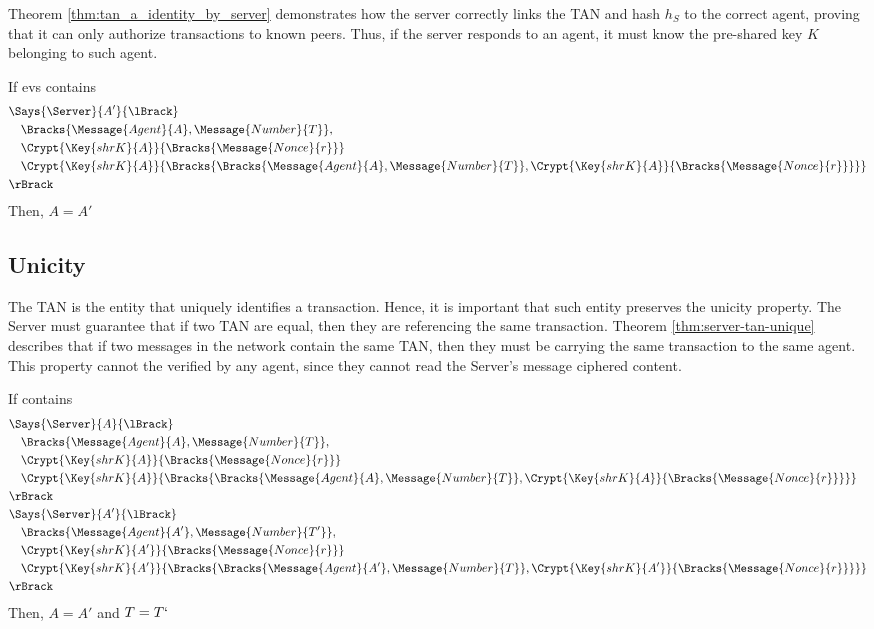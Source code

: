 Theorem \ref{thm:tan_a_identity_by_server} demonstrates how the server correctly links the TAN and hash \(h_S\) to the correct agent, proving that it can only authorize transactions to known peers. Thus, if the server responds to an agent, it must know the pre-shared key \(K\) belonging to such agent.

\begin{theorem}
  \label{thm:tan_a_identity_by_server}
  If evs contains
  \begin{align*}
    & \Says{\Server}{A'}{\lBrack} \\
      & \quad \Bracks{\Message{Agent}{A}, \Message{Number}{T}}, \\
      & \quad \Crypt{\Key{shrK}{A}}{\Bracks{\Message{Nonce}{r}}} \\
      & \quad \Crypt{\Key{shrK}{A}}{\Bracks{\Bracks{\Message{Agent}{A}, \Message{Number}{T}},\Crypt{\Key{shrK}{A}}{\Bracks{\Message{Nonce}{r}}}}} \\
    & \rBrack
  \end{align*}
  Then, $A = A'$
\end{theorem}



\subsection{Unicity}
The TAN is the entity that uniquely identifies a transaction. Hence, it is important that such entity preserves the unicity property. The Server must guarantee that if two TAN are equal, then they are referencing the same transaction. Theorem \ref{thm:server-tan-unique} describes that if two messages in the network contain the same TAN, then they must be carrying the same transaction to the same agent. This property cannot the verified by any agent, since they cannot read the Server's message ciphered content.

\begin{theorem}
\label{thm:server-tan-unique}
  If  contains
  \begin{align*}
    & \Says{\Server}{A}{\lBrack} \\
      & \quad \Bracks{\Message{Agent}{A}, \Message{Number}{T}}, \\
      & \quad \Crypt{\Key{shrK}{A}}{\Bracks{\Message{Nonce}{r}}} \\
      & \quad \Crypt{\Key{shrK}{A}}{\Bracks{\Bracks{\Message{Agent}{A}, \Message{Number}{T}},\Crypt{\Key{shrK}{A}}{\Bracks{\Message{Nonce}{r}}}}} \\
    & \rBrack \\
    & \Says{\Server}{A'}{\lBrack} \\
      & \quad \Bracks{\Message{Agent}{A'}, \Message{Number}{T'}}, \\
      & \quad \Crypt{\Key{shrK}{A'}}{\Bracks{\Message{Nonce}{r}}} \\
      & \quad \Crypt{\Key{shrK}{A'}}{\Bracks{\Bracks{\Message{Agent}{A'}, \Message{Number}{T}},\Crypt{\Key{shrK}{A'}}{\Bracks{\Message{Nonce}{r}}}}} \\
    & \rBrack
  \end{align*}
  Then, $A = A'$ and $T = T`$
\end{theorem}
